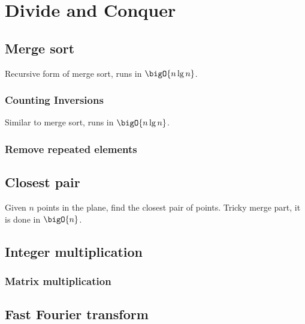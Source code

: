 \chapter{Divide and Conquer}
\section*{Merge sort}
Recursive form of merge sort, runs in \(\bigO{n \lg n}\).


\subsection*{Counting Inversions}
Similar to merge sort, runs in \(\bigO{n \lg n}\).

\subsection*{Remove repeated elements}

\section*{Closest pair}
Given \(n\) points in the plane, find the closest pair of points. Tricky merge part, it is done in \(\bigO{n}\).

\section*{Integer multiplication}

\subsection*{Matrix multiplication}
\section*{Fast Fourier transform}
